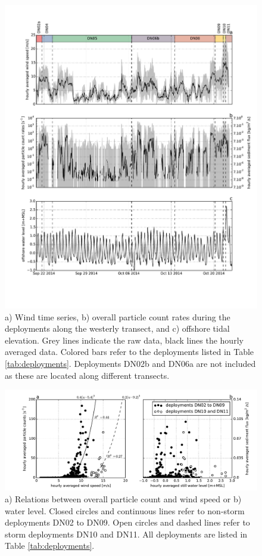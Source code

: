 \begin{figure}
 \centering
  \includegraphics[width=\columnwidth]{../Figures/particlecounts_timeseries}
  \caption{a) Wind time series, b) overall particle count rates during
    the deployments along the westerly transect, and c) offshore tidal
    elevation. Grey lines indicate the raw data, black lines the
    hourly averaged data. Colored bars refer to the deployments listed
    in Table \ref{tab:deployments}. Deployments DN02b and DN06a are
    not included as these are located along different transects.}
  \label{fig:pc_timeseries}
\end{figure}

\begin{figure}
 \centering
  \includegraphics[width=\columnwidth]{../Figures/particlecounts_correlations}
  \caption{a) Relations between overall particle count and wind speed
    or b) water level. Closed circles and continuous lines refer to
    non-storm deployments DN02 to DN09. Open circles and dashed lines
    refer to storm deployments DN10 and DN11. All deployments are
    listed in Table \ref{tab:deployments}.}
  \label{fig:pc_correlations}
\end{figure}

